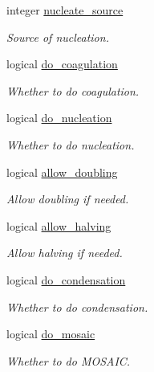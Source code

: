\begin{DoxyCompactItemize}
integer \mbox{\hyperlink{structpmc__run__part_1_1run__part__opt__t_a318672abd15a8082e085827a14c7c712}{nucleate\+\_\+source}}
\begin{DoxyCompactList}\small\item\em Source of nucleation. \end{DoxyCompactList}\item 
logical \mbox{\hyperlink{structpmc__run__part_1_1run__part__opt__t_af21ed01ef354156b16c11b0019aee6bb}{do\+\_\+coagulation}}
\begin{DoxyCompactList}\small\item\em Whether to do coagulation. \end{DoxyCompactList}\item 
logical \mbox{\hyperlink{structpmc__run__part_1_1run__part__opt__t_a964f0006793a6e5b3d448ca9b6f3f81e}{do\+\_\+nucleation}}
\begin{DoxyCompactList}\small\item\em Whether to do nucleation. \end{DoxyCompactList}\item 
logical \mbox{\hyperlink{structpmc__run__part_1_1run__part__opt__t_a7ed053ed123c4dae999f860c964ec8b7}{allow\+\_\+doubling}}
\begin{DoxyCompactList}\small\item\em Allow doubling if needed. \end{DoxyCompactList}\item 
logical \mbox{\hyperlink{structpmc__run__part_1_1run__part__opt__t_a8a76ed66e17d073471fb669b80bcc595}{allow\+\_\+halving}}
\begin{DoxyCompactList}\small\item\em Allow halving if needed. \end{DoxyCompactList}\item 
logical \mbox{\hyperlink{structpmc__run__part_1_1run__part__opt__t_ad198ae224ea69e6c6c4f280de4d8d660}{do\+\_\+condensation}}
\begin{DoxyCompactList}\small\item\em Whether to do condensation. \end{DoxyCompactList}\item 
logical \mbox{\hyperlink{structpmc__run__part_1_1run__part__opt__t_a6088cc1b639a38344961ab86dd259be7}{do\+\_\+mosaic}}
\begin{DoxyCompactList}\small\item\em Whether to do M\+O\+S\+A\+IC. \end{DoxyCompactList}\item 

\end{DoxyCompactItemize}
